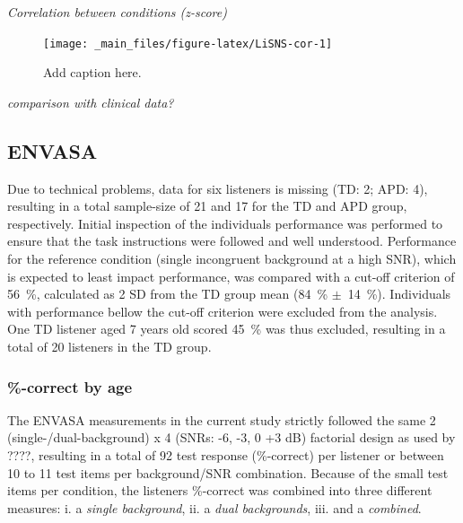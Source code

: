 \documentclass[a4paper, twoside]{templates/ociamthesis}
\begin{document}
\colorbox[HTML]{CCCCFF}{\emph{Correlation between conditions (z-score)}}

\begin{figure}

{\centering \texttt{[image: \_main\_files/figure-latex/LiSNS-cor-1]} 

}

\caption{Add caption here.}\label{fig:LiSNS-cor}
\end{figure}

\colorbox[HTML]{CCCCFF}{\emph{comparison with clinical data?}}

\hypertarget{envasa}{%
\subsection{ENVASA}\label{envasa}}

Due to technical problems, data for six listeners is missing (TD: 2; APD: 4), resulting in a total sample-size of 21 and 17 for the TD and APD group, respectively. Initial inspection of the individuals performance was performed to ensure that the task instructions were followed and well understood. Performance for the reference condition (single incongruent background at a high SNR), which is expected to least impact performance, was compared with a cut-off criterion of 56~\%, calculated as 2 SD from the TD group mean (84~\% \(\pm\)~14~\%). Individuals with performance bellow the cut-off criterion were excluded from the analysis. One TD listener aged 7 years old scored 45~\% was thus excluded, resulting in a total of 20 listeners in the TD group.

\hypertarget{correct-by-age}{%
\subsubsection*{\%-correct by age}\label{correct-by-age}}

The ENVASA measurements in the current study strictly followed the same 2 (single-/dual-background) x 4 (SNRs: -6, -3, 0 +3 dB) factorial design as used by ????, resulting in a total of 92 test response (\%-correct) per listener or between 10 to 11 test items per background/SNR combination. Because of the small test items per condition, the listeners \%-correct was combined into three different measures: i. a \emph{single background}, ii. a \emph{dual backgrounds}, iii. and a \emph{combined}.
\end{document}
